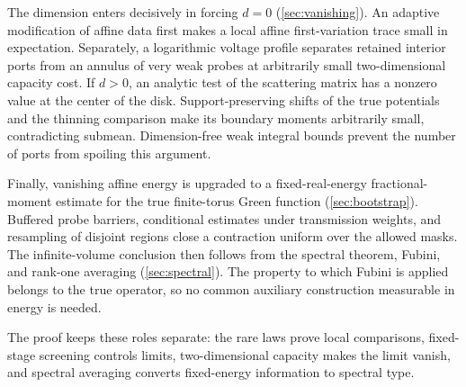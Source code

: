 The dimension enters decisively in forcing $d=0$ (\cref{sec:vanishing}).
An adaptive modification of affine data first makes a local affine
first-variation trace small in expectation. Separately, a logarithmic voltage profile separates
retained interior ports from an annulus of very weak probes at
arbitrarily small two-dimensional capacity cost. If $d>0$,
an analytic test of the scattering matrix has a nonzero value at the
center of the disk. Support-preserving shifts of the true potentials
and the thinning comparison make its boundary moments arbitrarily small,
contradicting submean. Dimension-free weak integral bounds prevent the
number of ports from spoiling this argument.

Finally, vanishing affine energy is upgraded to a fixed-real-energy
fractional-moment estimate for the true finite-torus Green function
(\cref{sec:bootstrap}).
Buffered probe barriers, conditional estimates under transmission
weights, and resampling of disjoint regions close a contraction uniform
over the allowed masks. The infinite-volume conclusion then follows
from the spectral theorem, Fubini, and rank-one averaging
(\cref{sec:spectral}). The property
to which Fubini is applied belongs to the true operator, so no common
auxiliary construction measurable in energy is needed.

The proof keeps these roles separate: the rare laws prove local
comparisons, fixed-stage screening controls limits, two-dimensional
capacity makes the limit vanish, and spectral averaging converts
fixed-energy information to spectral type.
